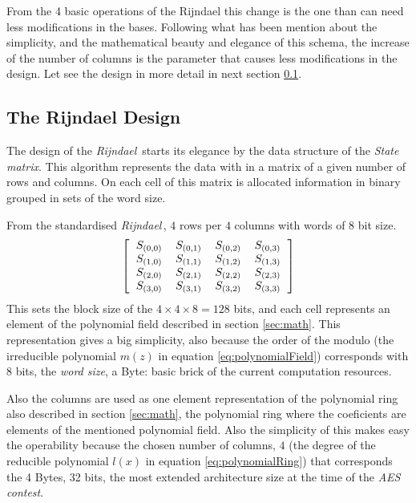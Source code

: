 \documentclass[10pt,a4paper,twoside]{llncs}
\newcommand{\rijndael}{\emph{Rijndael}}
\begin{document}
From the 4 basic operations of the Rijndael this change is the one than can need less modifications in the bases. Following what has been mention about the simplicity, and the mathematical beauty and elegance of this schema, the increase of the number of columns is the parameter that causes less modifications in the design. Let see the design in more detail in next section \ref{sec:design}.


\subsection{The Rijndael Design}\label{sec:design}

The design of the \rijndael\, starts its elegance by the data structure of the \emph{State matrix}. This algorithm represents the data with in a matrix of a given number of rows and columns. On each cell of this matrix is allocated information in binary grouped in sets of the word size.

From the standardised \rijndael\,, $4$ rows per $4$ columns with words of $8$ bit size.
\begin{equation}\label{eq:stateMatrix}
 \left[
 \begin{tabular}{cccc}
  $S_{(0,0)}$ & $S_{(0,1)}$ & $S_{(0,2)}$ & $S_{(0,3)}$ \\
  $S_{(1,0)}$ & $S_{(1,1)}$ & $S_{(1,2)}$ & $S_{(1,3)}$ \\
  $S_{(2,0)}$ & $S_{(2,1)}$ & $S_{(2,2)}$ & $S_{(2,3)}$ \\
  $S_{(3,0)}$ & $S_{(3,1)}$ & $S_{(3,2)}$ & $S_{(3,3)}$ \\
 \end{tabular}
 \right]
\end{equation}
This sets the block size of the $4\times4\times8=128$ bits, and each cell represents an element of the polynomial field described in section \ref{sec:math}. This representation gives a big simplicity, also because the order of the modulo (the irreducible polynomial $m(z)$ in equation \ref{eq:polynomialField}) corresponds with $8$ bits, the \emph{word size}, a Byte: basic brick of the current computation resources.

Also the columns are used as one element representation of the polynomial ring also described in section \ref{sec:math}, the polynomial ring where the coeficients are elements of the mentioned polynomial field. Also the simplicity of this makes easy the operability because the chosen number of columns, $4$ (the degree of the reducible polynomial $l(x)$ in equation \ref{eq:polynomialRing}) that corresponds the 4 Bytes, 32 bits, the most extended architecture size at the time of the \emph{AES contest}.
\end{document}
